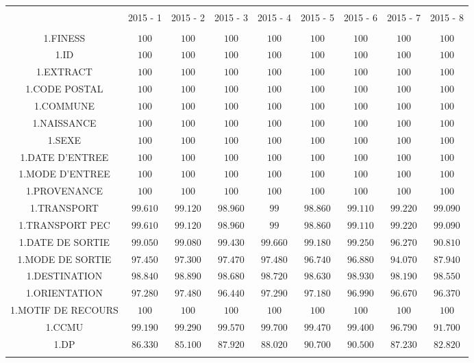 \documentclass[]{article}
\begin{document}
\begin{table}[!htbp] \centering 
  \caption{} 
  \label{} 
\begin{tabular}{@{\extracolsep{5pt}} ccccccccc} 
\\[-1.8ex]\hline 
\hline \\[-1.8ex] 
 & 2015 - 1 & 2015 - 2 & 2015 - 3 & 2015 - 4 & 2015 - 5 & 2015 - 6 & 2015 - 7 & 2015 - 8 \\ 
\hline \\[-1.8ex] 
1.FINESS & $100$ & $100$ & $100$ & $100$ & $100$ & $100$ & $100$ & $100$ \\ 
1.ID & $100$ & $100$ & $100$ & $100$ & $100$ & $100$ & $100$ & $100$ \\ 
1.EXTRACT & $100$ & $100$ & $100$ & $100$ & $100$ & $100$ & $100$ & $100$ \\ 
1.CODE POSTAL & $100$ & $100$ & $100$ & $100$ & $100$ & $100$ & $100$ & $100$ \\ 
1.COMMUNE & $100$ & $100$ & $100$ & $100$ & $100$ & $100$ & $100$ & $100$ \\ 
1.NAISSANCE & $100$ & $100$ & $100$ & $100$ & $100$ & $100$ & $100$ & $100$ \\ 
1.SEXE & $100$ & $100$ & $100$ & $100$ & $100$ & $100$ & $100$ & $100$ \\ 
1.DATE D'ENTREE & $100$ & $100$ & $100$ & $100$ & $100$ & $100$ & $100$ & $100$ \\ 
1.MODE D'ENTREE & $100$ & $100$ & $100$ & $100$ & $100$ & $100$ & $100$ & $100$ \\ 
1.PROVENANCE & $100$ & $100$ & $100$ & $100$ & $100$ & $100$ & $100$ & $100$ \\ 
1.TRANSPORT & $99.610$ & $99.120$ & $98.960$ & $99$ & $98.860$ & $99.110$ & $99.220$ & $99.090$ \\ 
1.TRANSPORT PEC & $99.610$ & $99.120$ & $98.960$ & $99$ & $98.860$ & $99.110$ & $99.220$ & $99.090$ \\ 
1.DATE DE SORTIE & $99.050$ & $99.080$ & $99.430$ & $99.660$ & $99.180$ & $99.250$ & $96.270$ & $90.810$ \\ 
1.MODE DE SORTIE & $97.450$ & $97.300$ & $97.470$ & $97.480$ & $96.740$ & $96.880$ & $94.070$ & $87.940$ \\ 
1.DESTINATION & $98.840$ & $98.890$ & $98.680$ & $98.720$ & $98.630$ & $98.930$ & $98.190$ & $98.550$ \\ 
1.ORIENTATION & $97.280$ & $97.480$ & $96.440$ & $97.290$ & $97.180$ & $96.990$ & $96.670$ & $96.370$ \\ 
1.MOTIF DE RECOURS & $100$ & $100$ & $100$ & $100$ & $100$ & $100$ & $100$ & $100$ \\ 
1.CCMU & $99.190$ & $99.290$ & $99.570$ & $99.700$ & $99.470$ & $99.400$ & $96.790$ & $91.700$ \\ 
1.DP & $86.330$ & $85.100$ & $87.920$ & $88.020$ & $90.700$ & $90.500$ & $87.230$ & $82.820$ \\ 
\hline \\[-1.8ex] 
\end{tabular} 
\end{table}
\end{document}
